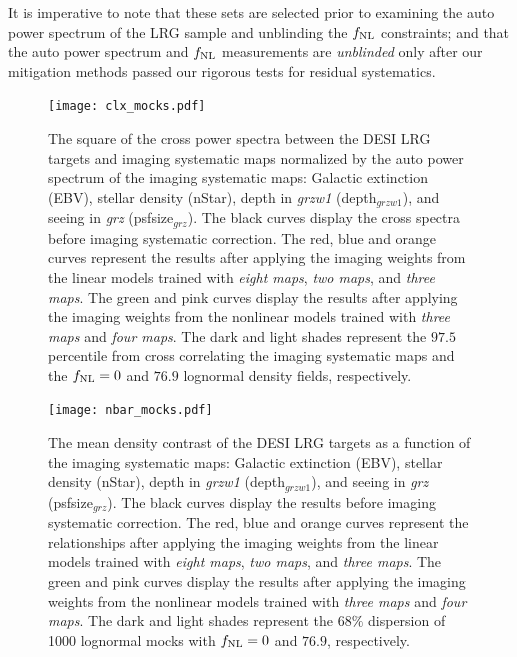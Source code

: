 It is imperative to note that these sets are selected prior to examining the auto power spectrum of the LRG sample and unblinding the $f_{\rm NL}$ constraints; and that the auto power spectrum and $f_{\rm NL}$ measurements are \textit{unblinded} only after our mitigation methods passed our rigorous tests for residual systematics. 



\begin{figure}
\centering
\texttt{[image: clx\_mocks.pdf]}
\caption{The square of the cross power spectra between the DESI LRG targets and imaging systematic maps normalized by the auto power spectrum of the imaging systematic maps: Galactic extinction (EBV), stellar density (nStar), depth in \textit{grzw1} (depth$_{grzw1}$), and seeing in \textit{grz} (psfsize$_{grz}$). The black curves display the cross spectra before imaging systematic correction. The red, blue and orange curves represent the results after applying the imaging weights from the linear models trained with \textit{eight maps}, \textit{two maps}, and \textit{three maps}. The green and pink curves display the results after applying the imaging weights from the nonlinear models trained with \textit{three maps} and \textit{four maps}. The dark and light shades represent the $97.5$ percentile from cross correlating the imaging systematic maps and the $f_{\rm NL}=0$ and $76.9$ lognormal density fields, respectively.}\label{fig:clxmock}
\end{figure}

\begin{figure}
\centering
\texttt{[image: nbar\_mocks.pdf]}
\caption{The mean density contrast of the DESI LRG targets as a function of the imaging systematic maps: Galactic extinction (EBV), stellar density (nStar), depth in \textit{grzw1} (depth$_{grzw1}$), and seeing in \textit{grz} (psfsize$_{grz}$). The black curves display the results before imaging systematic correction. The red, blue and orange curves represent the relationships after applying the imaging weights from the linear models trained with \textit{eight maps}, \textit{two maps}, and \textit{three maps}. The green and pink curves display the results after applying the imaging weights from the nonlinear models trained with \textit{three maps} and \textit{four maps}. The dark and light shades represent the $68\%$ dispersion of 1000 lognormal mocks with $f_{\rm NL}=0$ and $76.9$, respectively.}\label{fig:nbarmock}
\end{figure}


